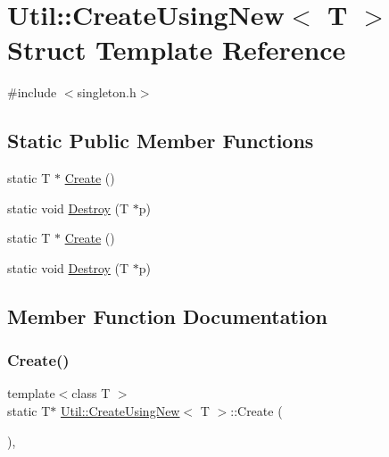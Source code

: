 \hypertarget{structUtil_1_1CreateUsingNew}{}\section{Util\+:\+:Create\+Using\+New$<$ T $>$ Struct Template Reference}
\label{structUtil_1_1CreateUsingNew}


{\ttfamily \#include $<$singleton.\+h$>$}

\subsection*{Static Public Member Functions}
\begin{DoxyCompactItemize}
\item 
static T $\ast$ \mbox{\hyperlink{structUtil_1_1CreateUsingNew_ad9b089ba34328e89a9e6b6211ee714c5}{Create}} ()
\item 
static void \mbox{\hyperlink{structUtil_1_1CreateUsingNew_a5e4b35ac95cb42c29d2542422ac6d17d}{Destroy}} (T $\ast$p)
\item 
static T $\ast$ \mbox{\hyperlink{structUtil_1_1CreateUsingNew_ad9b089ba34328e89a9e6b6211ee714c5}{Create}} ()
\item 
static void \mbox{\hyperlink{structUtil_1_1CreateUsingNew_a5e4b35ac95cb42c29d2542422ac6d17d}{Destroy}} (T $\ast$p)
\end{DoxyCompactItemize}


\subsection{Member Function Documentation}
\mbox{\label{structUtil_1_1CreateUsingNew_ad9b089ba34328e89a9e6b6211ee714c5}} 
\subsubsection{\texorpdfstring{Create()}{Create()}\hspace{0.1cm}{\footnotesize\ttfamily [1/2]}}
{\footnotesize\ttfamily template$<$class T $>$ \\
static T$\ast$ \mbox{\hyperlink{structUtil_1_1CreateUsingNew}{Util\+::\+Create\+Using\+New}}$<$ T $>$\+::Create (\begin{DoxyParamCaption}{ }\end{DoxyParamCaption})\hspace{0.3cm}{\ttfamily [inline]}, {\ttfamily [static]}}


